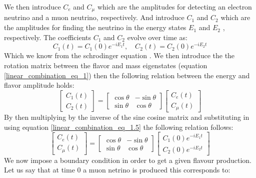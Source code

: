 \documentclass[12pt,a4paper]{article}
\begin{document}
We then introduce $C_e$ and $C_\mu$ which are the amplitudes for detecting an electron neutrino and a muon neutrino, respectively. And introduce $C_1$ and $C_2$ which are the amplitudes for finding the neutrino in the energy states $E_1$ and $E_2$ , respectively. The coefficients $C_1$ and $C_2$ evolve over time as:
\begin{equation}
    C_1(t) = C_1(0)e^{-iE_1t}, \quad  C_2(t) = C_2(0)e^{-iE_2t}
    \label{linear_combination_eq_1.5}
\end{equation}
Which we know from the schrodinger equation \cite{sassaroli1999neutrino} \cite{griffiths2008book}\cite{griffiths2008neutrinoOscillations}. We then introduce the the rotation matrix between the flavor and mass eigenstates (equation \ref{linear_combination_eq_1}) then the following relation between the energy and flavor amplitude holds:
\begin{equation}
    \begin{bmatrix}
        C_1(t) \\
        C_2(t)
    \end{bmatrix}
    =
    \begin{bmatrix}
        \cos\theta & -\sin\theta \\
        \sin\theta & \cos\theta 
    \end{bmatrix}
        \begin{bmatrix}
        C_e(t) \\
        C_\mu(t)
    \end{bmatrix}
    \label{linear_combination_eq_2}
\end{equation}
By then multiplying by the inverse of the sine cosine matrix and substituting in using equation \ref{linear_combination_eq_1.5} the following relation follows:
\begin{equation}
    \begin{bmatrix}
        C_e(t) \\
        C_\mu(t)
    \end{bmatrix}
    =
    \begin{bmatrix}
        \cos\theta & -\sin\theta \\
        \sin\theta & \cos\theta 
    \end{bmatrix}
        \begin{bmatrix}
        C_1(0)e^{-iE_1t} \\
        C_2(0)e^{-iE_2t}
    \end{bmatrix}
    \label{linear_combination_eq_3}
\end{equation}
We now impose a boundary condition in order to get a given flavour production. Let us say that at time 0 a muon netrino is produced this corresponds to:
\end{document}
